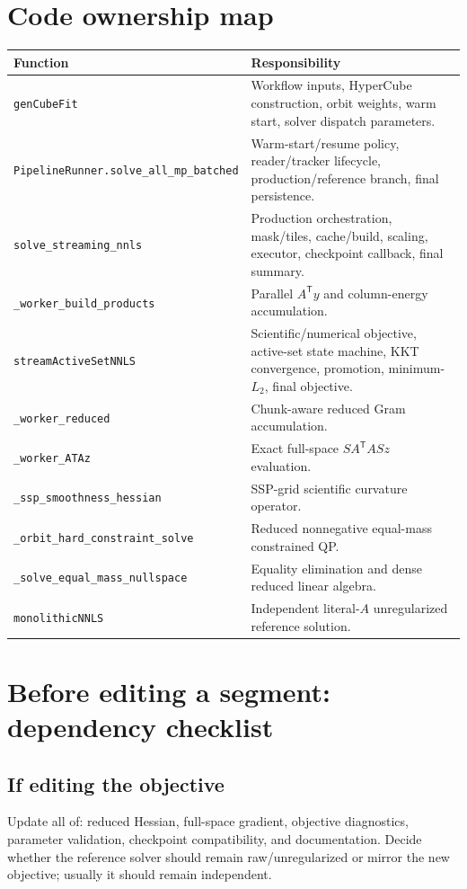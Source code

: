 \documentclass[10pt,a4paper]{article}
\newcommand{\code}[1]{\texttt{#1}}
\begin{document}
\section{Code ownership map}
\begin{longtable}{p{}p{}}
\toprule
\textbf{Function} & \textbf{Responsibility}\\
\midrule\endhead
\code{genCubeFit} & Workflow inputs, HyperCube construction, orbit weights, warm start, solver dispatch parameters.\\
\code{PipelineRunner.solve\_all\_mp\_batched} & Warm-start/resume policy, reader/tracker lifecycle, production/reference branch, final persistence.\\
\code{solve\_streaming\_nnls} & Production orchestration, mask/tiles, cache/build, scaling, executor, checkpoint callback, final summary.\\
\code{\_worker\_build\_products} & Parallel $A^{\mathsf T}y$ and column-energy accumulation.\\
\code{streamActiveSetNNLS} & Scientific/numerical objective, active-set state machine, KKT convergence, promotion, minimum-$L_2$, final objective.\\
\code{\_worker\_reduced} & Chunk-aware reduced Gram accumulation.\\
\code{\_worker\_ATAz} & Exact full-space $SA^{\mathsf T}ASz$ evaluation.\\
\code{\_ssp\_smoothness\_hessian} & SSP-grid scientific curvature operator.\\
\code{\_orbit\_hard\_constraint\_solve} & Reduced nonnegative equal-mass constrained QP.\\
\code{\_solve\_equal\_mass\_nullspace} & Equality elimination and dense reduced linear algebra.\\
\code{monolithicNNLS} & Independent literal-$A$ unregularized reference solution.\\
\bottomrule
\end{longtable}

\section{Before editing a segment: dependency checklist}
\subsection{If editing the objective}
Update all of: reduced Hessian, full-space gradient, objective diagnostics, parameter validation, checkpoint compatibility, and documentation. Decide whether the reference solver should remain raw/unregularized or mirror the new objective; usually it should remain independent.
\end{document}
